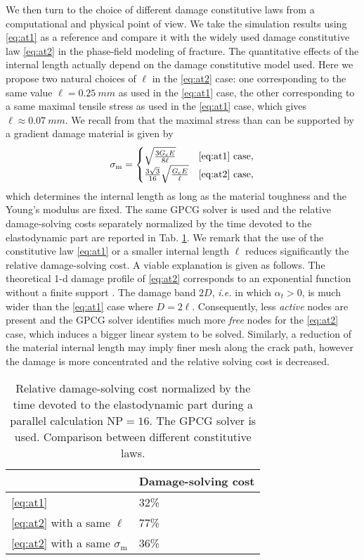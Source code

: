 We then turn to the choice of different damage constitutive laws from a computational and physical point of view. We take the simulation results using \eqref{eq:at1} as a reference and compare it with the widely used damage constitutive law \eqref{eq:at2} in the phase-field modeling of fracture. The quantitative effects of the internal length actually depend on the damage constitutive model used. Here we propose two natural choices of $\ell$ in the \eqref{eq:at2} case: one corresponding to the same value $\ell=\SI{0.25}{mm}$ as used in the \eqref{eq:at1} case, the other corresponding to a same maximal tensile stress as used in the \eqref{eq:at1} case, which gives $\ell\approx\SI{0.07}{mm}$. We recall from \cite{PhamAmorMarigoMaurini:2011} that the maximal stress than can be supported by a gradient damage material is given by
\begin{equation} \label{eq:sigm}
\sigma_\mathrm{m}=\begin{cases}
\sqrt{\frac{3G_\mathrm{c} E}{8\ell}} & \text{\eqref{eq:at1} case}, \\
\frac{3\sqrt{3}}{16}\sqrt{\frac{G_\mathrm{c} E}{\ell}} & \text{\eqref{eq:at2} case},
\end{cases}
\end{equation}
which determines the internal length as long as the material toughness and the Young's modulus are fixed. The same GPCG solver is used and the relative damage-solving costs separately normalized by the time devoted to the elastodynamic part are reported in Tab. \ref{tab:at1_vs_at2}. We remark that the use of the constitutive law \eqref{eq:at1} or a smaller internal length $\ell$ reduces significantly the relative damage-solving cost. A viable explanation is given as follows. The theoretical 1-d damage profile of \eqref{eq:at2} corresponds to an exponential function without a finite support \cite{BourdinFrancfortMarigo:2008,MieheHofackerWelschinger:2010}. The damage band $2D$, \emph{i.e.} in which $\alpha_t>0$, is much wider than the \eqref{eq:at1} case where $D=2\ell$. Consequently, less \emph{active} nodes are present and the GPCG solver identifies much more \emph{free} nodes for the \eqref{eq:at2} case, which induces a bigger linear system to be solved. Similarly, a reduction of the material internal length may imply finer mesh along the crack path, however the damage is more concentrated and the relative solving cost is decreased.
\begin{table}[htbp]

\centering
\caption{Relative damage-solving cost normalized by the time devoted to the elastodynamic part during a parallel calculation $\mathrm{NP}=16$. The GPCG solver is used. Comparison between different constitutive laws.} \label{tab:at1_vs_at2}
\begin{tabular}{ll} \toprule
& Damage-solving cost  \\ \midrule
\eqref{eq:at1} & 32\% \\
\eqref{eq:at2} with a same $\ell$ & 77\% \\
\eqref{eq:at2} with a same $\sigma_\mathrm{m}$ & 36\% \\ \bottomrule
\end{tabular}
\end{table}

